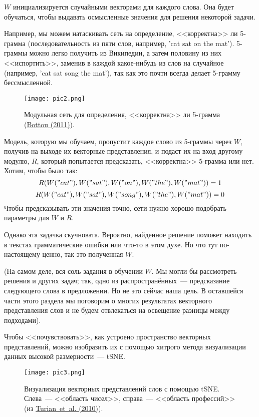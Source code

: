 \documentclass[a4paper,12pt]{article}
\begin{document}
$W$ инициализируется случайными векторами для каждого слова. Она будет обучаться, чтобы выдавать осмысленные значения для решения некоторой задачи.

Например, мы можем натаскивать сеть на определение, <<корректна>> ли 5-грамма (последовательность из пяти слов, например, 'cat sat on the mat'). 5-граммы можно легко получить из Википедии, а затем половину из них <<испортить>>, заменив в каждой какое-нибудь из слов на случайное (например, 'cat sat song the mat'), так как это почти всегда делает 5-грамму бессмысленной.

\begin{figure}[t]
\begin{center}
\texttt{[image: pic2.png]}
\caption{Модульная сеть для определения, <<корректна>> ли 5-грамма (\href{http://arxiv.org/pdf/1102.1808v3.pdf}{Bottou (2011)}).}
\end{center}
\end{figure}

Модель, которую мы обучаем, пропустит каждое слово из 5-граммы через $W$, получив на выходе их векторные представления, и подаст их на вход другому модулю, $R$, который попытается предсказать, <<корректна>> 5-грамма или нет. Хотим, чтобы было так:
$$R(W("cat"), W("sat"), W("on"), W("the"), W("mat"))=1$$
$$R(W("cat"), W("sat"), W("song"), W("the"), W("mat"))=0$$
Чтобы предсказывать эти значения точно, сети нужно хорошо подобрать параметры для $W$ и $R$.

Однако эта задачка скучновата. Вероятно, найденное решение поможет находить в текстах грамматические ошибки или что-то в этом духе. Но что тут по-настоящему ценно, так это полученная $W$.

(На самом деле, вся соль задания в обучении $W$. Мы могли бы рассмотреть решения и других задач; так, одно из распространённых~--- предсказание следующего слова в предложении. Но не это сейчас наша цель. В оставшейся части этого раздела мы поговорим о многих результатах векторного представления слов и не будем отвлекаться на освещение разницы между подходами).

Чтобы <<почувствовать>>, как устроено пространство векторных представлений, можно изобразить их с помощью хитрого метода визуализации данных высокой размерности~--- tSNE.

\begin{figure}[t]
\begin{center}
\texttt{[image: pic3.png]}
\caption{Визуализация векторных представлений слов с помощью tSNE. Слева~--- <<область чисел>>, справа~--- <<область профессий>> (из \href{http://www.iro.umontreal.ca/~lisa/pointeurs/turian-wordrepresentations-acl10.pdf}{Turian~et~al. (2010)}).}
\end{center}
\end{figure}
\end{document}
